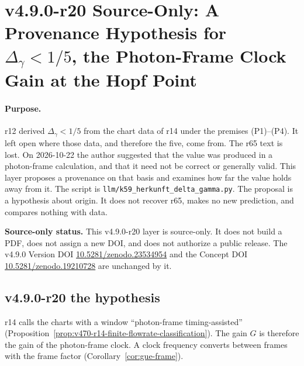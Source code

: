 \clearpage
\section*{v4.9.0-r20 Source-Only: A Provenance Hypothesis for \texorpdfstring{\(\Delta_\gamma<1/5\)}{Delta gamma < 1/5}, the Photon-Frame Clock Gain at the Hopf Point}
\label{sec:v490-r20-delta-gamma-provenance}

\paragraph{Purpose.}
r12 derived \(\Delta_\gamma<1/5\) from the chart data of r14 under the premises (P1)--(P4).  It left open where those
data, and therefore the five, come from.  The r65 text is lost.  On 2026-10-22 the author suggested that the value was produced
in a photon-frame calculation, and that it need not be correct or generally valid.  This layer proposes a provenance on that
basis and examines how far the value holds away from it.  The script is \texttt{llm/k59\_herkunft\_delta\_gamma.py}.  The
proposal is a hypothesis about origin.  It does not recover r65, makes no new prediction, and compares nothing with data.

\noindent\textbf{Source-only status.}
This v4.9.0-r20 layer is source-only.  It does not build a PDF, does not assign a new DOI,
and does not authorize a public release.  The v4.9.0 Version DOI
\href{https://doi.org/10.5281/zenodo.23534954}{10.5281/zenodo.23534954} and the Concept DOI
\href{https://doi.org/10.5281/zenodo.19210728}{10.5281/zenodo.19210728} are unchanged by it.

\subsection*{v4.9.0-r20 the hypothesis}
\label{subsec:v490-r20-hypothesis}

r14 calls the charts with a window ``photon-frame timing-assisted'' (Proposition~\ref{prop:v470-r14-finite-flowrate-classification}).
The gain \(G\) is therefore the gain of the photon-frame clock.  A clock frequency converts between frames with the frame factor
(Corollary~\ref{cor:gue-frame}).


